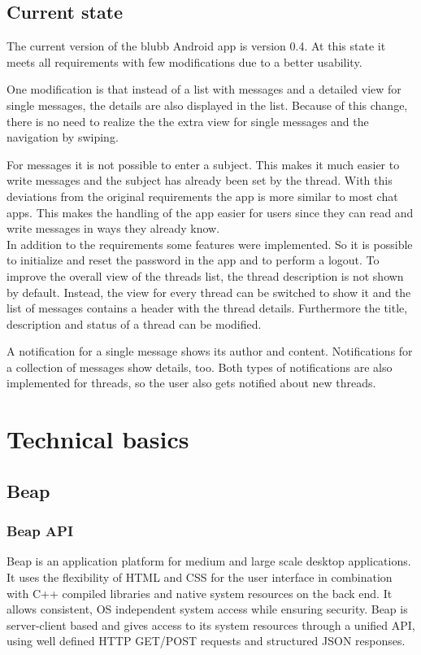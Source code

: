 \documentclass[12pt,a4paper,oneside]{report}
\begin{document}
\section{Current state}
The current version of the blubb Android app is version 0.4. At this state it meets all requirements with few modifications due to a better usability. 

One modification is that instead of a list with messages and a detailed view for single messages, the details are also displayed in the list. Because of this change, there is no need to realize the the extra view for single messages and the navigation by swiping.

For messages it is not possible to enter a subject. This makes it much easier to write messages and the subject has already been set by the thread.
With this deviations from the original requirements the app is more similar to most chat apps. 
This makes the handling of the app easier for users since they can read and write messages in ways they already know.\\

In addition to the requirements some features were implemented. So it is possible to initialize and reset the password in the app and to perform a logout. 
To improve the overall view of the threads list, the thread description is not shown by default. Instead, the view for every thread can be switched to show it and the list of messages contains a header with the thread details. 
Furthermore the title, description and status of a thread can be modified. 

A notification for a single message shows its author and content. Notifications for a collection of messages show details, too. Both types of notifications are also implemented for threads, so the user also gets notified about new threads. 

\chapter{Technical basics}
\section{Beap} \label{sec:beap}
\subsection{Beap API}
Beap is an application platform for medium and large scale desktop applications. It uses the flexibility of HTML and CSS for the user interface in combination with C++ compiled libraries and native system resources on the back end.
It allows consistent, OS independent system access while ensuring security.
Beap is server-client based and gives access to its system resources through a unified API, using well defined HTTP GET/POST requests and structured JSON responses. \citep{beap}
\end{document}
